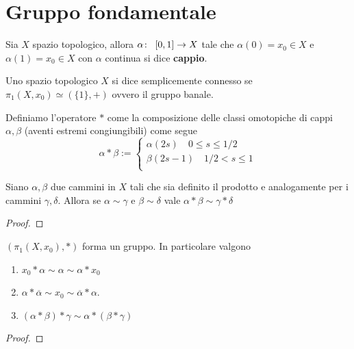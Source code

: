 \section{Gruppo fondamentale}

\begin{definition}
	Sia $X$ spazio topologico, allora $\alpha \colon\ \left[0,1\right] \rightarrow X$ tale che $\alpha(0) = x_0 \in X$ e $\alpha(1) = x_0 \in X$ con $\alpha$ continua si dice \textbf{cappio}.
\end{definition}

\begin{definition}
	Uno spazio topologico $X$ si dice semplicemente connesso se $\pi_1(X, x_0) \simeq (\{1\}, +)$ ovvero il gruppo banale. 
 \end{definition}

\begin{definition}
	Definiamo l'operatore $*$ come la composizione delle classi omotopiche di cappi $\alpha, \beta$ (aventi estremi congiungibili) come segue
	\begin{equation*}
	\alpha * \beta :=
	\begin{cases}
		\alpha(2s) \quad 0 \le s \le 1/2 \\
		\beta(2s - 1) \quad 1/2 < s \le 1 \\ 
	\end{cases}
	\end{equation*}
\end{definition}

\begin{theorem}
	Siano $\alpha, \beta$ due cammini in $X$ tali che sia definito il prodotto e analogamente per i cammini $\gamma, \delta$. Allora se $\alpha \sim \gamma$ e $\beta \sim \delta$ vale $\alpha * \beta \sim \gamma * \delta$
\end{theorem}
\begin{proof}
\end{proof}

\begin{theorem}
	$(\pi_1(X, x_0), *)$ forma un gruppo. In particolare valgono
	\begin{enumerate}
		\item $x_0 * \alpha \sim \alpha \sim \alpha * x_0$
		\item $\alpha * \overline{\alpha} \sim x_0 \sim \overline{\alpha} * \alpha$.
		\item $(\alpha * \beta) * \gamma \sim \alpha * (\beta * \gamma)$
	\end{enumerate} 
\end{theorem}
\begin{proof}
\end{proof}

